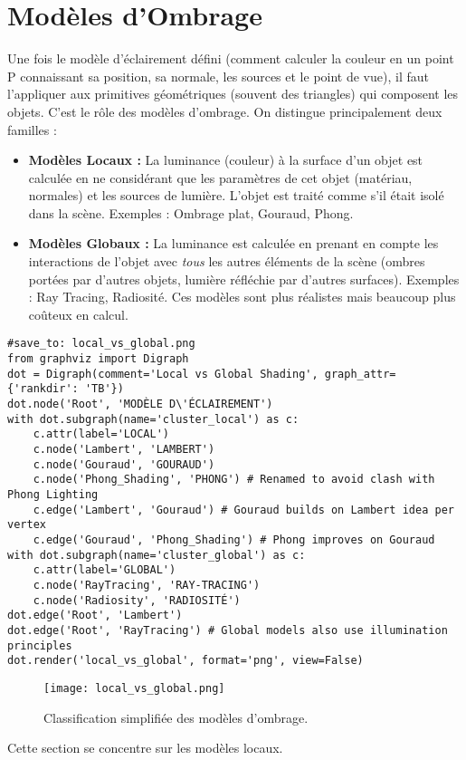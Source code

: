 \section{Modèles d'Ombrage}
Une fois le modèle d'éclairement défini (comment calculer la couleur en un point P connaissant sa position, sa normale, les sources et le point de vue), il faut l'appliquer aux primitives géométriques (souvent des triangles) qui composent les objets. C'est le rôle des modèles d'ombrage.
On distingue principalement deux familles :
\begin{itemize}
    \item \textbf{Modèles Locaux :} La luminance (couleur) à la surface d'un objet est calculée en ne considérant que les paramètres de cet objet (matériau, normales) et les sources de lumière. L'objet est traité comme s'il était isolé dans la scène. Exemples : Ombrage plat, Gouraud, Phong.
    \item \textbf{Modèles Globaux :} La luminance est calculée en prenant en compte les interactions de l'objet avec \textit{tous} les autres éléments de la scène (ombres portées par d'autres objets, lumière réfléchie par d'autres surfaces). Exemples : Ray Tracing, Radiosité. Ces modèles sont plus réalistes mais beaucoup plus coûteux en calcul.
\end{itemize}
\begin{verbatim}
#save_to: local_vs_global.png
from graphviz import Digraph
dot = Digraph(comment='Local vs Global Shading', graph_attr={'rankdir': 'TB'})
dot.node('Root', 'MODÈLE D\'ÉCLAIREMENT')
with dot.subgraph(name='cluster_local') as c:
    c.attr(label='LOCAL')
    c.node('Lambert', 'LAMBERT')
    c.node('Gouraud', 'GOURAUD')
    c.node('Phong_Shading', 'PHONG') # Renamed to avoid clash with Phong Lighting
    c.edge('Lambert', 'Gouraud') # Gouraud builds on Lambert idea per vertex
    c.edge('Gouraud', 'Phong_Shading') # Phong improves on Gouraud
with dot.subgraph(name='cluster_global') as c:
    c.attr(label='GLOBAL')
    c.node('RayTracing', 'RAY-TRACING')
    c.node('Radiosity', 'RADIOSITÉ')
dot.edge('Root', 'Lambert')
dot.edge('Root', 'RayTracing') # Global models also use illumination principles
dot.render('local_vs_global', format='png', view=False)
\end{verbatim}
\begin{figure}[H]
\centering
\texttt{[image: local\_vs\_global.png]}
\caption{Classification simplifiée des modèles d'ombrage.}
\label{fig:local_vs_global}
\end{figure}
Cette section se concentre sur les modèles locaux.
